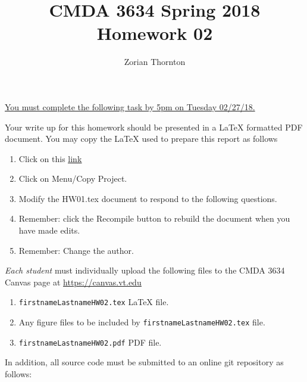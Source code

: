 \documentclass{article}
\newcommand{\pad}{\vspace{8pt}\noindent}
\newcommand{\myhref}[2]{\href{#1}{\color{foo}\underline{#2}\color{black}}}
\begin{document}
\title{CMDA 3634 Spring 2018 Homework 02}

\author{Zorian Thornton}
\vspace{-64pt}\maketitle
\begin{center}\underline{You must complete the following task by 5pm on Tuesday 02/27/18.}\end{center}
Your write up for this homework should be presented in a {\LaTeX} formatted PDF document. You may copy the \LaTeX{} used to prepare this report as follows

\begin{enumerate}
\item Click on this  \myhref{https://www.sharelatex.com/read/mbvthfjqwzgh}{link} 
\item Click on Menu/Copy Project.
\item Modify the HW01.tex document to respond to the following questions. 
\item Remember: click the Recompile button to rebuild the document when you have made edits.
\item Remember: Change the author. 

\end{enumerate}

\pad \emph{Each student} must individually upload the following files to the CMDA 3634 Canvas page at \myhref{https://canvas.vt.edu}{https://canvas.vt.edu}

\begin{enumerate}
\item \verb|firstnameLastnameHW02.tex| {\LaTeX} file.
\item Any figure files to be included by \verb|firstnameLastnameHW02.tex| file.
\item \verb|firstnameLastnameHW02.pdf| PDF file.
\end{enumerate}

\noindent In addition, all source code must be submitted to an online git repository as follows:
\end{document}

